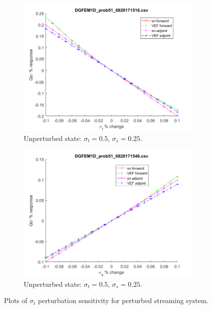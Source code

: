 \documentclass[12pt]{report}
\newcommand{\sigt}{\sigma_t}
\newcommand{\sigs}{\sigma_s}
\begin{document}
\begin{figure}[H]
\begin{subfigure}{.5\textwidth}
  \includegraphics[width=.98\linewidth]{figures/51sigtSens.png}
  \caption{Unperturbed state: $\sigt=0.5$, $\sigs=0.25$.}
  \label{fig:sfig3}
\end{subfigure}%
\begin{subfigure}{.5\textwidth}
  \centering
  \includegraphics[width=.98\linewidth]{figures/51sigsSens.png}
  \caption{Unperturbed state: $\sigt=0.5$, $\sigs=0.25$.}
  \label{fig:sfig6}
\end{subfigure}%
\caption{Plots of $\sigt$ perturbation sensitivity for perturbed streaming system.}
\label{fig:fig}
\end{figure}
\end{document}
